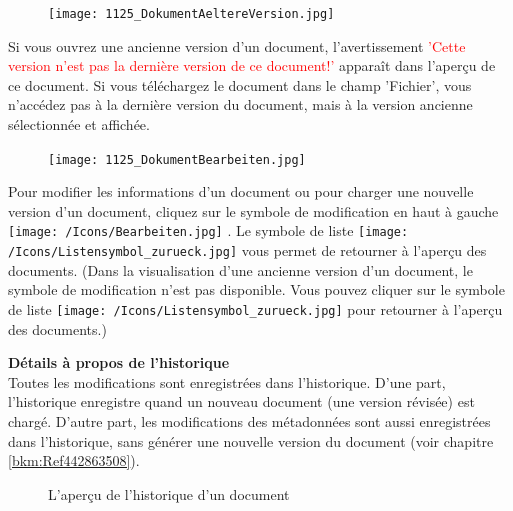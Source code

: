\begin{figure}
\vspace{-15pt}
\texttt{[image: 1125\_DokumentAeltereVersion.jpg]}
\end{figure}
Si vous ouvrez une ancienne version d'un document, l'avertissement \textcolor{red}{'Cette version n'est pas la dernière version de ce document!'} apparaît dans l'aperçu de ce document. Si vous téléchargez le document dans le champ 'Fichier', vous n'accédez pas à la dernière version du document, mais à la version ancienne sélectionnée et affichée.

\begin{figure}
\texttt{[image: 1125\_DokumentBearbeiten.jpg]}
\end{figure}
Pour modifier les informations d'un document ou pour charger une nouvelle version d'un document, cliquez sur le symbole de modification en haut à gauche \texttt{[image: /Icons/Bearbeiten.jpg]} . Le symbole de liste \texttt{[image: /Icons/Listensymbol\_zurueck.jpg]}  vous permet de retourner à l'aperçu des documents. (Dans la visualisation d'une ancienne version d'un document, le symbole de modification n'est pas disponible. Vous pouvez cliquer sur le symbole de liste \texttt{[image: /Icons/Listensymbol\_zurueck.jpg]} pour retourner à l'aperçu des documents.)

\vspace{\baselineskip}

\textbf{Détails à propos de l'historique} \\
Toutes les modifications sont enregistrées dans l'historique. D'une part, l'historique enregistre quand un nouveau document (une version révisée) est chargé. D'autre part, les modifications des métadonnées sont aussi enregistrées dans l'historique, sans générer une nouvelle version du document (voir chapitre \ref{bkm:Ref442863508}).

\begin{figure}[H]
\caption{L'aperçu de l'historique d'un document}
\end{figure}

